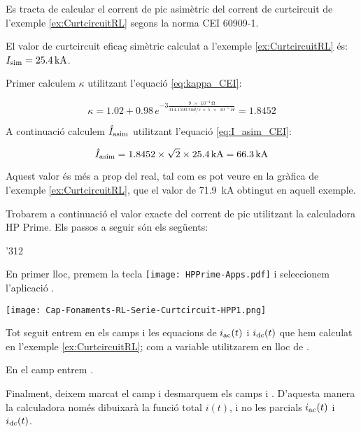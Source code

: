 \begin{exemple}\label{ex:CurtcircuitPicRL}
	\addcontentsxms{\CurtcircuitPicRL}	
    Es tracta de calcular el corrent de pic asimètric del corrent de curtcircuit de l'exemple \ref{ex:CurtcircuitRL} segons la norma CEI 60909-1.

    El valor de curtcircuit eficaç simètric calculat a l'exemple \vref{ex:CurtcircuitRL} és: $I_\mathrm{sim}= \qty{25,4}{kA}$.

    Primer calculem $\kappa$ utilitzant l'equació \eqref{eq:kappa_CEI}:

    \[
    \kappa = \num{1,02} + \num{0,98} \,e^{-3\frac{\qty{9e-4}{\ohm}}{\qty{314,1593}{rad/s}\, \times\, \qty{5e-5}{H}}} = \num{1,8452}
    \]

     A continuació calculem $\hat{I}_\mathrm{asim}$ utilitzant l'equació \eqref{eq:I_asim_CEI}:

    \[
    \hat{I}_\mathrm{asim} = \num{1,8452} \times \sqrt{2} \times \qty{25,4}{kA} = \qty{66,3}{kA}
    \]

    Aquest valor és més a prop del real, tal com es pot veure en la gràfica de l'exemple  \ref{ex:CurtcircuitRL}, que el valor de  \qty{71,9}{kA} obtingut en aquell exemple.

    Trobarem a continuació el valor exacte  del corrent de pic utilitzant la calculadora  \textsf{HP Prime}.
     Els passos a seguir són els següents:

     \begin{dingautolist}{'312}

        \item En primer lloc, premem la tecla \texttt{[image: HPPrime-Apps.pdf]} i seleccionem l'aplicació .

             \texttt{[image: Cap-Fonaments-RL-Serie-Curtcircuit-HPP1.png]}

        \item Tot seguit entrem en els camps  i  les equacions de $i_\mathrm{ac}(t)$ i $i_\mathrm{dc}(t)$ que hem calculat en l'exemple \vref{ex:CurtcircuitRL}; com a variable utilitzarem  en lloc de .

            En el camp  entrem .

            Finalment, deixem marcat el camp  i desmarquem els camps  i . D'aquesta manera la calculadora només dibuixarà la funció total $i(t)$, i no les parcials $i_\mathrm{ac}(t)$ i $i_\mathrm{dc}(t)$.



\end{dingautolist}
\end{exemple}
